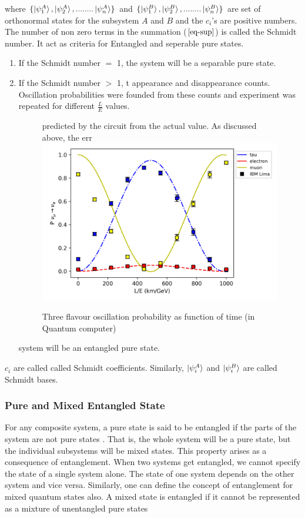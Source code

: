 \documentclass[12pt,a4paper]{report}
\begin{document}
where  $\{\ket{\psi_{1}^{A}},\ket{\psi_{2}^{A}},........\ket{\psi_{n}^{A}}\}$ and $\{\ket{\psi_{1}^{B}},\ket{\psi_{2}^{B}},........\ket{\psi_{n}^{B}}\}$ are set of orthonormal states for the subsystem $A$ and $B$ and the $c_{i}$’s are positive numbers. The number of non zero terms in the summation ($\ref{eq-sup}$) is called the Schmidt number. It act as criteria for Entangled and seperable pure states.
\begin{enumerate}
\item If the Schmidt number $=$ 1, the system will be a separable pure state.
\item If the Schmidt number $>$ 1, t appearance and disappearance counts. Oscillation probabilities were founded from these counts and experiment was repeated for different $\frac{L}{E}$ values.
\begin{figure}[h]
	\graphicspath{ {./Images/} }
	\centering	 predicted by the circuit from the actual value. As discussed above, the err
	{\includegraphics[scale=0.8]{fig_9.png}}
	\caption{Three flavour oscillation probability as function of time (in Quantum computer) }
	\label{fig 9}
\end{figure}\par system will be an entangled pure state.
\end{enumerate}
$c_{i}$ are called called Schmidt coefficients. Similarly, $\ket{\psi_{i}^{A}}$ and $\ket{\psi_{i}^{B}}$ are called Schmidt bases.
\subsubsection{ Pure and Mixed Entangled State}
For any composite system, a pure state is said to be entangled if the parts of the system are not pure states \cite{wootters}. That is, the whole system will be a pure state, but the individual subsystems will be mixed states. This property arises as a consequence of entanglement. When two systems get entangled, we cannot specify the state of a single system alone. The state of one system depends on the other system and vice versa. Similarly, one can define the concept of entanglement for mixed quantum states also. A mixed state is entangled if it cannot be represented as a mixture of unentangled pure states
\end{document}
